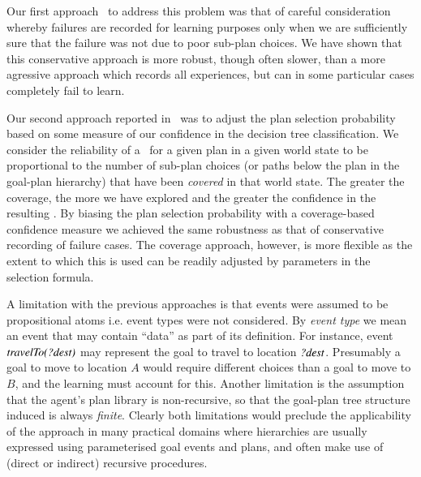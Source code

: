 Our first approach~\cite{Airiau:IJAT:09} to address this problem was that 
of careful consideration whereby failures are recorded for learning purposes 
only when we are sufficiently sure that the failure was not due to poor
sub-plan choices. 
We have shown that this conservative approach is more robust, 
though often slower, than a more agressive
approach which records all experiences, but can in some particular cases
completely fail to learn.

Our second approach reported in~\cite{Singh:AAMAS10} was to
adjust the plan selection probability based on some measure of 
our confidence in the decision tree classification.
%
We consider the reliability of a \dt\ for a given plan in a given 
world state to be proportional to the number of sub-plan choices (or paths
below the plan in the goal-plan hierarchy) that have been
\textit{covered} in that  
world state. The greater the coverage, the more we have explored and the
greater the confidence in the resulting \dt.
%
By biasing the plan selection probability with a coverage-based confidence
measure we achieved the same robustness as that of conservative recording of 
failure cases. The coverage approach, however, is more 
flexible as the extent to which this is used can be
readily adjusted by parameters in the selection formula. 


A limitation with the previous approaches is that 
events were assumed to be propositional atoms i.e. event
types were not considered. By \emph{event type} we mean an event that may
contain ``data'' as part of its definition. For instance, event
${\mbox{\textit{travelTo(?dest)}}}$ may represent the goal to travel to location
${\mbox{\textit{?dest}}}$. Presumably a goal to move to location $A$ would 
require different choices than a goal to move to $B$, and the learning
must account for this.
Another limitation is the assumption that the agent's plan library is
non-recursive, so that the goal-plan tree structure induced is always
\emph{finite}.
Clearly both limitations would preclude the applicability of the approach in
many practical domains where hierarchies are usually expressed
using parameterised goal events and plans, and often make
use of (direct or indirect) recursive procedures.


